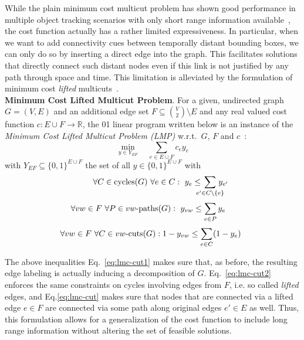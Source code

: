 While the plain minimum cost multicut problem has shown good performance in multiple object tracking scenarios with only short range information available~\cite{tang2016multi}, the cost function actually has a rather limited expressiveness. 
In particular, when we want to add connectivity cues between temporally distant bounding boxes, we can only do so by inserting a direct edge into the graph. 
This facilitates solutions that directly connect such distant nodes even if this link is not justified by any path through space and time. 
This limitation is alleviated by the formulation of minimum cost \emph{lifted} multicuts~\cite{keupericcv}.\\

\noindent\textbf{Minimum Cost Lifted Multicut Problem}.
For a given, undirected graph $G = (V, E)$ and an additional edge set $F\subseteq \binom{V}{2} \setminus E$ and any  real valued cost function $c: E \cup F \to \mathbb{R}$,
the 01 linear program written below is an instance of the
\emph{Minimum Cost Lifted Multicut Problem (LMP)}
w.r.t.~$G$, $F$ and $c$~\cite{keupericcv}:
%
\begin{equation}
\displaystyle\min_{y \in Y_{EF}} 
    \quad \sum_{e \in E \cup F} c_e y_e
    \label{eq:lmc}
\end{equation}
%
with $Y_{EF} \subseteq \{0,1\}^{E \cup F}$ the set of all $y \in \{0,1\}^{E \cup F}$ with
%
\begin{equation}
 \qquad\forall C \in \textnormal{cycles}(G)\ \forall e \in C:\ 
    y_e \leq \hspace{-2ex} \sum_{e' \in C \setminus \{e\}} \hspace{-2ex} y_{e'} 
\label{eq:lmc-cut1}
\end{equation}
\begin{equation}
 \forall vw \in F\ \forall P \in vw\textnormal{-paths}(G):\ 
    y_{vw} \leq \sum_{e \in P} y_e \quad
\label{eq:lmc-cut2}\end{equation}
\begin{equation}
 \hspace{-1ex} \forall vw \in F\ \forall C \in vw\textnormal{-cuts}(G):
    1 - y_{vw} \leq \sum_{e \in C} (1 - y_e) 
\label{eq:lmc-cut}
   \end{equation}

The above inequalities Eq.~\eqref{eq:lmc-cut1} makes sure that, as before, the resulting edge labeling is actually inducing a decomposition of $G$. Eq.~\eqref{eq:lmc-cut2} enforces the same constraints on cycles involving edges from $F$, i.e. so called \emph{lifted} edges, and Eq.\eqref{eq:lmc-cut} makes sure that nodes that are connected via a lifted edge $e\in F$ are connected via some path along original edges  $e'\in E$ as well. 
Thus, this formulation allows for a generalization of the cost function to include long range information without altering the set of feasible solutions.\\

